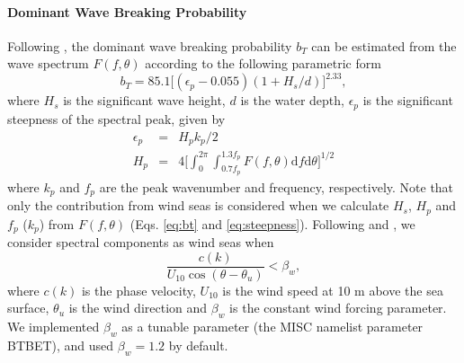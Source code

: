 \paragraph{Dominant Wave Breaking Probability}
Following \citet[][their Fig.~12]{art:BBY01}, the dominant wave breaking probability $b_T$ can be estimated from the wave spectrum $F(f, \theta)$ according to the following parametric form
\begin{equation}
b_T = 85.1 \Big[ (\epsilon_p - 0.055) (1 + H_s / d) \Big]^{2.33},
\label{eq:bt}
\end{equation}
where $H_s$ is the significant wave height, $d$ is the water depth, $\epsilon_p$ is the significant steepness of the spectral peak, given by
\begin{equation}
\begin{array}{rcl}
\epsilon_p &=& H_p k_p / 2\\
H_p &=& 4 \Big[\int_{0}^{2\pi} \int_{0.7f_p}^{1.3f_p} F(f, \theta) \mathrm{d}f \mathrm{d}\theta \Big]^{1/2}
\label{eq:steepness}
\end{array}
\end{equation}
where $k_p$ and $f_p$ are the peak wavenumber and frequency, respectively. Note that only the contribution from wind seas is considered when we calculate $H_s$, $H_p$ and $f_p$ ($k_p$) from $F(f, \theta)$ (Eqs. \ref{eq:bt} and \ref{eq:steepness}). Following \citet{Janssen1989} and \citet{Bidlot2001}, we consider spectral components as wind seas when
\begin{equation}
\frac{c(k)}{U_{10} \cos (\theta - \theta_u)}  < \beta_w,
\label{eq:beta}
\end{equation}
where $c(k)$ is the phase velocity, $U_{10}$ is the wind speed at 10 m above the sea surface, $\theta_u$ is the wind direction and $\beta_w$ is the constant wind forcing parameter. We implemented $\beta_w$ as a tunable parameter (the {\F MISC} namelist parameter {\code BTBET}), and used $\beta_w=1.2$ by default.

\noindent
